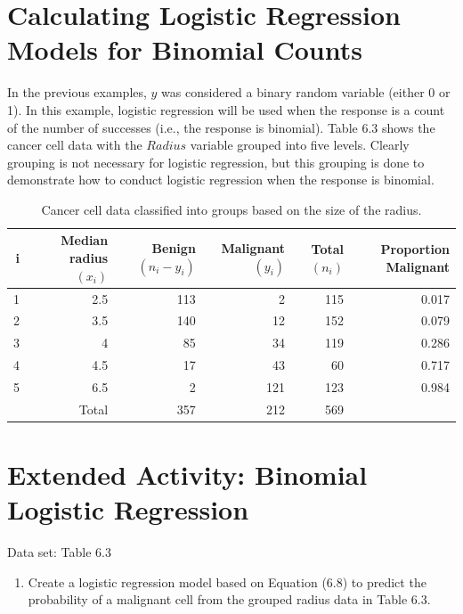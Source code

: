 \documentclass[
]{report}
\providecommand{\tightlist}{%
  \setlength{\itemsep}{0pt}\setlength{\parskip}{0pt}}
\begin{document}
\hypertarget{calculating-logistic-regression-models-for-binomial-counts}{%
\section{Calculating Logistic Regression Models for Binomial Counts}\label{calculating-logistic-regression-models-for-binomial-counts}}

In the previous examples, \(y\) was considered a binary random variable (either 0 or 1). In this example, logistic regression will be used when the response is a count of the number of successes (i.e., the response is binomial). Table 6.3 shows the cancer cell data with the \(Radius\) variable grouped into five levels. Clearly grouping is not necessary for logistic regression, but this grouping is done to demonstrate how to conduct logistic regression when the response is binomial.

\begin{table}[!h]
\centering
\caption{\label{tab:tab3}Cancer cell data classified into groups based on the size of the radius.}
\centering
\begin{tabular}[t]{rrrrrr}
\toprule
i & Median radius $(x_i)$ & Benign $(n_i - y_i)$ & Malignant $(y_i)$ & Total $(n_i)$ & Proportion Malignant\\
\midrule
1 & 2.5 & 113 & 2 & 115 & 0.017\\
2 & 3.5 & 140 & 12 & 152 & 0.079\\
3 & 4 & 85 & 34 & 119 & 0.286\\
4 & 4.5 & 17 & 43 & 60 & 0.717\\
5 & 6.5 & 2 & 121 & 123 & 0.984\\
\addlinespace
 & Total & 357 & 212 & 569 & \\
\bottomrule
\end{tabular}
\end{table}

\hypertarget{extended-activity-binomial-logistic-regression}{%
\section*{Extended Activity: Binomial Logistic Regression}\label{extended-activity-binomial-logistic-regression}}

Data set: Table 6.3

\begin{enumerate}
\def\labelenumi{\arabic{enumi}.}
\setcounter{enumi}{25}
\tightlist
\item
  Create a logistic regression model based on Equation (6.8) to predict the probability of a malignant cell from the grouped radius data in Table 6.3.\\
\end{enumerate}
\end{document}
